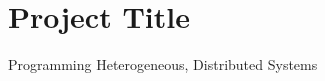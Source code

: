\section{Project Title}

\begin{center}

\bigskip

{\large Programming Heterogeneous, Distributed Systems}

\end{center}
